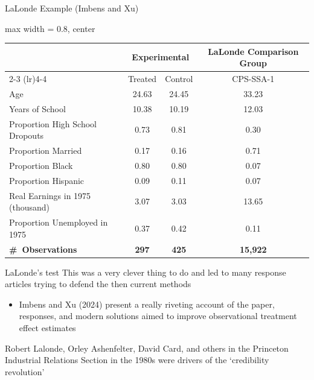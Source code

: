 \documentclass[aspectratio=169,t,11pt,table]{beamer}
\begin{document}
\begin{frame}{LaLonde Example (Imbens and Xu)}
  \begin{adjustbox}{max width = 0.8\textwidth, center}
    \begin{tabular}{lccc}
    \toprule
    & \multicolumn{2}{c}{\textbf{Experimental}} & \textbf{LaLonde Comparison Group} \\
    \cmidrule(lr){2-3} \cmidrule(lr){4-4}
    & Treated & Control & CPS-SSA-1 \\
    
    \midrule
    Age & 24.63 & 24.45 & 33.23 \\
    Years of School & 10.38 & 10.19 & 12.03 \\
    Proportion High School Dropouts & 0.73 & 0.81 & 0.30 \\
    Proportion Married & 0.17 & 0.16 & 0.71 \\
    Proportion Black & 0.80 & 0.80 & 0.07 \\
    Proportion Hispanic & 0.09 & 0.11 & 0.07 \\
    Real Earnings in 1975 (thousand) & 3.07 & 3.03 & 13.65 \\
    Proportion Unemployed in 1975 & 0.37 & 0.42 & 0.11 \\
    \midrule

    \textbf{\#\ Observations} & \textbf{297} & \textbf{425} & \textbf{15,922} \\
    \bottomrule
    \end{tabular}
  \end{adjustbox}
\end{frame}

\begin{frame}{LaLonde's test}
	This was a very clever thing to do and led to many response articles trying to defend the then current methods
	\begin{itemize}
		\item Imbens and Xu (2024) present a really riveting account of the paper, responses, and modern solutions aimed to improve observational treatment effect estimates
	\end{itemize}

	\pause
	\bigskip
	Robert Lalonde, Orley Ashenfelter, David Card, and others in the Princeton Industrial Relations Section in the 1980s were drivers of the `credibility revolution'
\end{frame}
\end{document}
